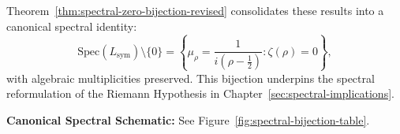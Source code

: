 \medskip
\noindent
Theorem~\ref{thm:spectral-zero-bijection-revised} consolidates these results into a canonical spectral identity:
\[
\mathrm{Spec}(L_{\mathrm{sym}}) \setminus \{0\} = \left\{ \mu_\rho = \frac{1}{i(\rho - \tfrac{1}{2})} : \zeta(\rho) = 0 \right\},
\]
with algebraic multiplicities preserved. This bijection underpins the spectral reformulation of the Riemann Hypothesis in Chapter~\ref{sec:spectral-implications}.

\medskip
\noindent\textbf{Canonical Spectral Schematic:} See Figure~\ref{fig:spectral-bijection-table}.


%  